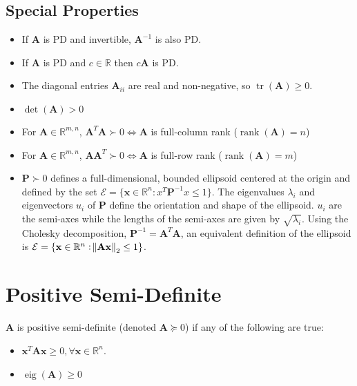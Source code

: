 \documentclass{book}
\newcommand{\mA}{\mathbf{A}}
\newcommand{\mP}{\mathbf{P}}
\newcommand{\vx}{\mathbf{x}}
\DeclareMathOperator{\eig}{eig}
\DeclareMathOperator{\trace}{tr}
\DeclareMathOperator{\rank}{rank}
\newcommand{\sR}{\mathbb{R}}
\newcommand{\sRn}{\mathbb{R}^{n}}
\newcommand{\sRmn}{\mathbb{R}^{m,n}}
\newcommand{\ispsd}{\succeq}
\newcommand{\ispd}{\succ}
\begin{document}
\subsection*{Special Properties}

\begin{itemize}
\item If $\mA$ is PD and invertible, $\mA^{-1}$ is also PD.
\item If $\mA$ is PD and $c\in\sR$ then $c\mA$ is PD.
\item The diagonal entries $\mA_{ii}$ are real and non-negative, so $\trace(\mA)\ge0$. %
\item $\det(\mA)>0$
\item For $\mA\in\sRmn$, $\mA^T\mA\ispd0\iff \mA$ is full-column rank ($\rank(\mA)=n$)
\item For $\mA\in\sRmn$, $\mA\mA^T\ispd0\iff \mA$ is full-row rank ($\rank(\mA)=m$)
\item $\mP\ispd0$ defines a full-dimensional, bounded ellipsoid centered at the origin and defined by the set $\mathcal{E}=\{\vx\in\sRn: x^T\mP^{-1}x\le1\}$. The eigenvalues $\lambda_i$ and eigenvectors $u_i$ of $\mP$ define the orientation and shape of the ellipsoid. $u_i$ are the semi-axes while the lengths of the semi-axes are given by $\sqrt{\lambda_i}$. Using the Cholesky decomposition, $\mP^{-1}=\mA^T\mA$, an equivalent definition of the ellipsoid is $\mathcal{E}=\{\vx\in\sRn: \norm{\mA\vx}_2\le1\}$.
\end{itemize}

\section{Positive Semi-Definite}

$\mA$ is positive semi-definite (denoted $\mA\ispsd0$) if any of the following are true:
\begin{itemize}
\item $\vx^T\mA\vx\ge0,\forall\vx\in\sRn$.
\item $\eig(\mA)\ge0$
\end{itemize}
\end{document}
